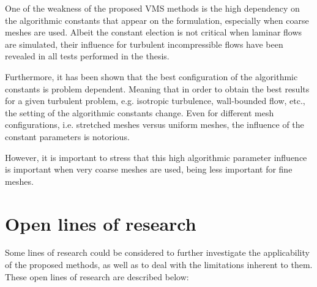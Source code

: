 One of the weakness of the proposed VMS methods is the high dependency on the algorithmic constants that appear on the formulation, especially when coarse meshes are used. Albeit the constant election is not critical when laminar flows are simulated, their influence for turbulent incompressible flows have been revealed in all tests performed in the thesis.

Furthermore, it has been shown that the best configuration of the algorithmic constants is problem dependent. Meaning that in order to obtain the best results for a given turbulent problem, e.g. isotropic turbulence, wall-bounded flow, etc., the setting of the algorithmic constants change. Even for different mesh configurations, i.e. stretched meshes versus uniform meshes, the influence of the constant parameters is notorious.

However, it is important to stress that this high algorithmic parameter influence is important when very coarse meshes are used, being less important for fine meshes.

\section{Open lines of research}
\label{sec-C9_open_lines}
Some lines of research could be considered to further investigate the applicability of the proposed methods, as well as to deal with the limitations inherent to them. These open lines of research are described below:

